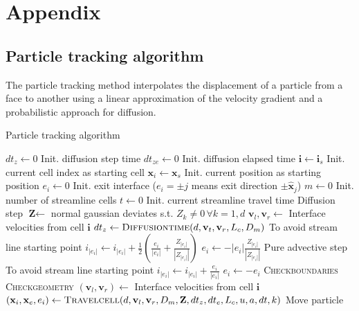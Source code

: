 \chapter{Appendix}
\section{Particle tracking algorithm}
The particle tracking method interpolates the displacement of a particle from a face to another using a linear approximation of the velocity gradient and a probabilistic approach for diffusion.

\begin{algorithm}[H]
	\caption{Particle tracking algorithm}
	\label{alg:part_track}
	\begin{algorithmic}[1]
		\State $dt_z\leftarrow0$ \Comment Init. diffusion step time
		\State $dt_{ze}\leftarrow0$ \Comment	Init. diffusion elapsed time
		\State $\textbf{i}\leftarrow \textbf{i}_s$ \Comment Init. current cell index as starting cell
		\State $\textbf{x}_i\leftarrow \textbf{x}_s$ \Comment Init. current position as starting position
		\State $e_i\leftarrow0$ \Comment Init. exit interface ($e_i=\pm j$ means exit direction $\pm\hat{\textbf{x}}_j$)
		\State $m\leftarrow0$ \Comment Init. number of streamline cells
		\State $t\leftarrow0$ \Comment Init. current streamline travel time
		\Repeat
		 \Comment Diffusion step
		\State $\textbf{Z}\leftarrow $ normal gaussian deviates s.t. $Z_k\neq0\,\forall k=1,d$
		\State $\textbf{v}_l,\textbf{v}_r$$\leftarrow$ Interface velocities from cell $\textbf{i}$
		\State $dt_z\leftarrow\textsc{Diffusiontime}(d,\textbf{v}_t,\textbf{v}_r,L_c,D_m)$
		 \Comment To avoid stream line starting point
		\State $i_{|e_i|}\leftarrow i_{|e_i|} + \frac{1}{2}(\frac{e_i}{|e_i|}+\frac{Z_{|e_i|}}{|Z_{|e_i|}|}) $
		\State $e_i \leftarrow -|e_i|\frac{Z_{|e_i|}}{|Z_{|e_i|}|}$ 
		\EndIf
		\Else \Comment Pure advective step
		 \Comment To avoid stream line starting point
		\State $i_{|e_i|}\leftarrow i_{|e_i|} + \frac{e_i}{|e_i|} $ 
		\State $e_i \leftarrow -e_i$ 
		\EndIf
		\EndIf
		\State \textsc{Checkboundaries}
		\State \textsc{Checkgeometry}
		\State $(\textbf{v}_l,\textbf{v}_r)$$\leftarrow$ Interface velocities from cell $\textbf{i}$
		\State $(\textbf{x}_i,\textbf{x}_e,e_i)\leftarrow\textsc{Travelcell}(d, \textbf{v}_l, \textbf{v}_r, D_m, \textbf{Z}, dt_z, dt_e,L_c, u, a, dt, k)$ 
		\Comment Move particle
		\EndProcedure
	\end{algorithmic}
\end{algorithm}

